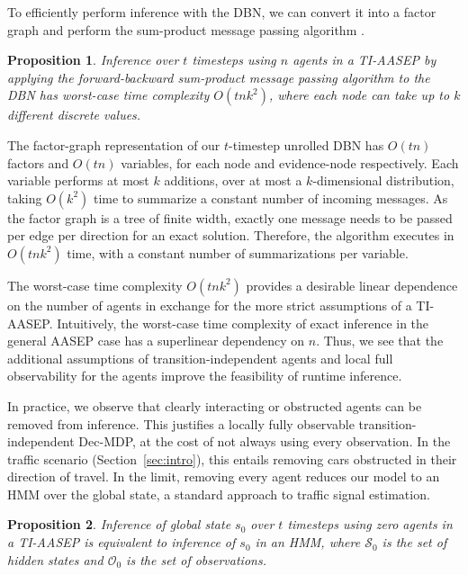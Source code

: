 \documentclass[letterpaper,10pt,conference]{ieeeconf}
\let\proof\relax
\let\endproof\relax
\newtheorem{proposition}{Proposition}
\newenvironment{proofsketch}{%
    \renewcommand{\proofname}{Proof Sketch}\proof}{\endproof}
\begin{document}
To efficiently perform inference with the DBN, we can convert it into a factor graph and perform the sum-product message passing algorithm \cite{kschischang2001factor}. 

\begin{proposition}
    Inference over $t$ timesteps using $n$ agents in a TI-AASEP by applying the forward-backward sum-product message passing algorithm to the DBN has worst-case time complexity $O(tnk^2)$, where each node can take up to $k$ different discrete values.
    \label{prop:runtime-complexity}
\end{proposition}

\begin{proofsketch}
     The factor-graph representation of our $t$-timestep unrolled DBN has $O(tn)$ factors and $O(tn)$ variables, for each node and evidence-node respectively. Each variable performs at most $k$ additions, over at most a $k$-dimensional distribution, taking $O(k^2)$ time to summarize a constant number of incoming messages. As the factor graph is a tree of finite width, exactly one message needs to be passed per edge per direction for an exact solution. Therefore, the algorithm executes in $O(tnk^2)$ time, with a constant number of summarizations per variable. 
\end{proofsketch}

The worst-case time complexity $O(tnk^2)$ provides a desirable linear dependence on the number of agents in exchange for the more strict assumptions of a TI-AASEP. Intuitively, the worst-case time complexity of exact inference in the general AASEP case has a superlinear dependency on $n$. Thus, we see that the additional assumptions of transition-independent agents and local full observability for the agents improve the feasibility of runtime inference. 

In practice, we observe that clearly interacting or obstructed agents can be removed from inference. This justifies a locally fully observable transition-independent Dec-MDP, at the cost of not always using every observation. In the traffic scenario (Section~\ref{sec:intro}), this entails removing cars obstructed in their direction of travel. In the limit, removing every agent reduces our model to an HMM over the global state, a standard approach to traffic signal estimation. 

\begin{proposition}
    Inference of global state $s_0$ over $t$ timesteps using zero agents in a TI-AASEP is equivalent to inference of $s_0$ in an HMM, where $\mathcal{S}_0$ is the set of hidden states and $\mathcal{O}_0$ is the set of observations.
    \label{prop:degenhmm}
\end{proposition}
\end{document}
